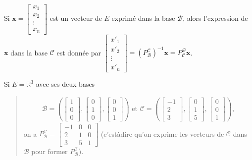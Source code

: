 \documentclass[letterpaper,11pt,english]{sphinxmanual}
\begin{document}
\begin{DUlineblock}{0em}
\item[]  Si
\(\mathbf{x}=\begin{bmatrix} x_1\\x_2\\ \vdots\\ x_n \end{bmatrix}\)
est un vecteur de \(E\) exprimé dans la base \(\mathcal{B}\),
alors l’expression de \(\mathbf{x}\) dans la base
\(\mathcal{C}\) est donnée par
\(\begin{bmatrix} x'_1\\x'_2\\ \vdots\\ x'_n \end{bmatrix}=(P_{\mathcal{B}}^{\mathcal{C}})^{-1}\mathbf{x}=P_{\mathcal{C}}^{\mathcal{B}}\mathbf{x}\).
\item[]  Si \(E=\mathbb{R}^3\) avec ses deux bases
\end{DUlineblock}

\begin{DUlineblock}{0em}
\item[] 
\end{DUlineblock}
\begin{quote}
\begin{equation}\label{equation:chapter2:chapter2:10}
\begin{split}\mathcal{B}=\left(
\begin{bmatrix}
1\\0\\0
\end{bmatrix},\begin{bmatrix}
0\\1\\0
\end{bmatrix},\begin{bmatrix}
0\\0\\1
\end{bmatrix}
\right) \text{ et } \mathcal{C}=\left(
\begin{bmatrix}
-1\\2\\3
\end{bmatrix},\begin{bmatrix}
0\\1\\5
\end{bmatrix},\begin{bmatrix}
0\\0\\1
\end{bmatrix}
\right),\end{split}
\end{equation}
\sphinxAtStartPar
on a
\(P_{\mathcal{B}}^{\mathcal{C}} = \begin{bmatrix} -1&0&0\\ 2&1&0\\ 3&5&1 \end{bmatrix}\)
(c’est\sphinxhyphen{}à\sphinxhyphen{}dire qu’on exprime les vecteurs de \(\mathcal{C}\) dans
\(\mathcal{B}\) pour former
\(P_{\mathcal{B}}^{\mathcal{C}}\)).
\end{quote}
\end{document}
